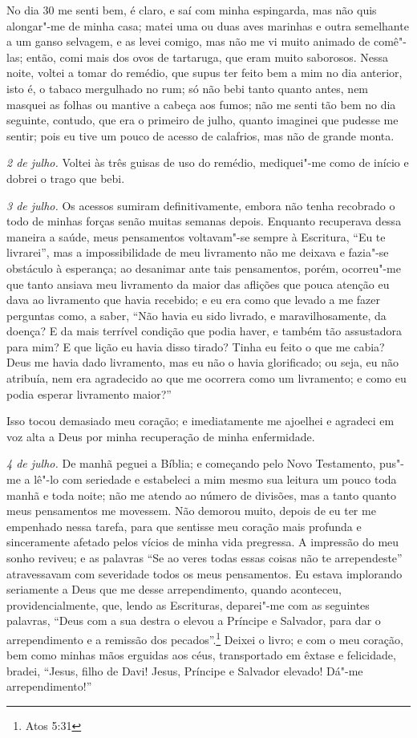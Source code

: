 No dia 30 me senti bem, é claro, e saí com minha espingarda, mas não
quis alongar"-me de minha casa; matei uma ou duas aves marinhas e outra
semelhante a um ganso selvagem, e as levei comigo, mas não me vi muito
animado de comê"-las; então, comi mais dos ovos de tartaruga, que eram
muito saborosos. Nessa noite, voltei a tomar do remédio, que supus ter
feito bem a mim no dia anterior, isto é, o tabaco mergulhado no rum; só
não bebi tanto quanto antes, nem masquei as folhas ou mantive a cabeça
aos fumos; não me senti tão bem no dia seguinte, contudo, que era o
primeiro de julho, quanto imaginei que pudesse me sentir; pois eu tive
um pouco de acesso de calafrios, mas não de grande monta.

\emph{2 de julho.} Voltei às três guisas de uso do remédio, mediquei"-me
como de início e dobrei o trago que bebi.

\emph{3 de julho.} Os acessos sumiram definitivamente, embora não tenha
recobrado o todo de minhas forças senão muitas semanas depois. Enquanto
recuperava dessa maneira a saúde, meus pensamentos voltavam"-se sempre à
Escritura, ``Eu te livrarei'', mas a impossibilidade de meu livramento
não me deixava e fazia"-se obstáculo à esperança; ao desanimar ante tais
pensamentos, porém, ocorreu"-me que tanto ansiava meu livramento da maior
das aflições que pouca atenção eu dava ao livramento que havia recebido;
e eu era como que levado a me fazer perguntas como, a saber, ``Não havia
eu sido livrado, e maravilhosamente, da doença? E da mais terrível
condição que podia haver, e também tão assustadora para mim? E que lição
eu havia disso tirado? Tinha eu feito o que me cabia? Deus me havia dado
livramento, mas eu não o havia glorificado; ou seja, eu não atribuía,
nem era agradecido ao que me ocorrera como um livramento; e como eu
podia esperar livramento maior?''

Isso tocou demasiado meu coração; e imediatamente me ajoelhei e agradeci
em voz alta a Deus por minha recuperação de minha enfermidade.

\emph{4 de julho.} De manhã peguei
a Bíblia; e começando pelo Novo Testamento, pus"-me a lê"-lo com seriedade
e estabeleci a mim mesmo sua leitura um pouco toda manhã e toda noite;
não me atendo ao número de divisões, mas a tanto quanto meus pensamentos
me movessem. Não demorou muito, depois de eu ter me empenhado nessa
tarefa, para que sentisse meu coração mais profunda e sinceramente
afetado pelos vícios de minha vida pregressa. A impressão do meu sonho
reviveu; e as palavras ``Se ao veres todas essas coisas não te
arrependeste'' atravessavam com severidade todos os meus pensamentos. Eu
estava implorando seriamente a Deus que me desse arrependimento, quando
aconteceu, providencialmente, que, lendo as Escrituras, deparei"-me com
as seguintes palavras, ``Deus com a sua destra o elevou a Príncipe e
Salvador, para dar o arrependimento e a remissão dos
pecados''.\footnote{Atos 5:31} Deixei o livro; e com o meu coração, bem
como minhas mãos erguidas aos céus, transportado em êxtase e felicidade,
bradei, ``Jesus, filho de Davi! Jesus, Príncipe e Salvador elevado!
Dá"-me arrependimento!''

